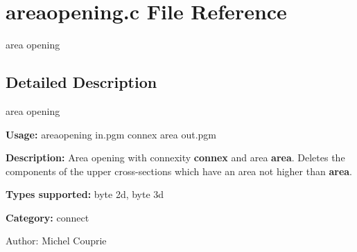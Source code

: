 \section{areaopening.c File Reference}
\label{areaopening_8c}
area opening  




\label{_details}
\subsection{Detailed Description}
area opening 

{\bf Usage:} areaopening in.pgm connex area out.pgm

{\bf Description:} Area opening with connexity {\bf connex} and area {\bf area}. Deletes the components of the upper cross-sections which have an area not higher than {\bf area}.

{\bf Types supported:} byte 2d, byte 3d

{\bf Category:} connect

\begin{Desc}
\item[Author:]Michel Couprie \end{Desc}
